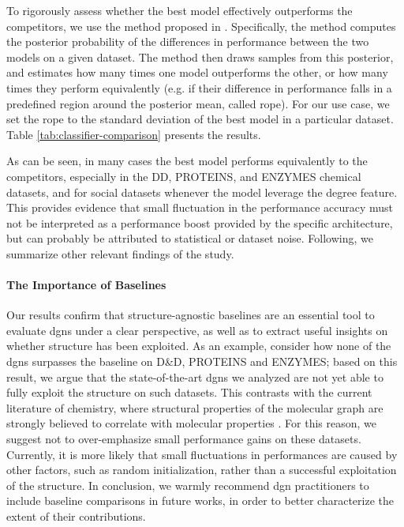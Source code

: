To rigorously assess whether the best model effectively outperforms the competitors, we use the method proposed in \cite{benavoli2017bayesiancomparison}. Specifically, the method computes the posterior probability of the differences in performance between the two models on a given dataset. The method then draws samples from this posterior, and estimates how many times one model outperforms the other, or how many times they perform equivalently (e.g. if their difference in performance falls in a predefined region around the posterior mean, called rope). For our use case, we set the rope to the standard deviation of the best model in a particular dataset. Table \ref{tab:classifier-comparison} presents the results.

\begin{landscape}
    
\end{landscape}

As can be seen, in many cases the best model performs equivalently to the competitors, especially in the DD, PROTEINS, and ENZYMES chemical datasets, and for social datasets whenever the model leverage the degree feature. This provides evidence that small fluctuation in the performance accuracy must not be interpreted as a performance boost provided by the specific architecture, but can probably be attributed to statistical or dataset noise. Following, we summarize other relevant findings of the study.

\paragraph{The Importance of Baselines}
Our results confirm that structure-agnostic baselines are an essential tool to evaluate \glspl{dgn} under a clear perspective, as well as to extract useful insights on whether structure has been exploited. As an example, consider how none of the \glspl{dgn} surpasses the baseline on D\&D, PROTEINS and ENZYMES; based on this result, we argue that the state-of-the-art \glspl{dgn} we analyzed are not yet able to fully exploit the structure on such datasets. This contrasts with the current literature of chemistry, where structural properties of the molecular graph are strongly believed to correlate with molecular properties \citep{vanrossum1965chemical}. For this reason, we suggest not to over-emphasize small performance gains on these datasets. Currently, it is more likely that small fluctuations in performances are caused by other factors, such as random initialization, rather than a successful exploitation of the structure. In conclusion, we warmly recommend \gls{dgn} practitioners to include baseline comparisons in future works, in order to better characterize the extent of their contributions.

